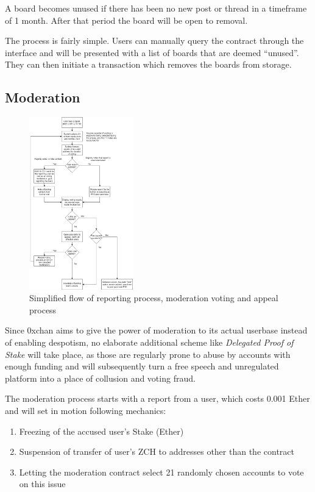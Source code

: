\documentclass[a4paper]{article}
\newcommand{\projectname}{0xchan}
\begin{document}
A board becomes unused if there has been no new post or thread in a timeframe of 1 month. After that period the board will be open to removal.

The process is fairly simple. Users can manually query the contract through the interface and will be presented with a list of boards that are deemed ``unused''. They can then initiate a transaction which removes the boards from storage.

\subsection{Moderation}
\begin{figure}
    \includegraphics[width=0.4\textwidth]{0x_moderation.png}
    \caption{Simplified flow of reporting process, moderation voting and appeal process}
    \label{fig:mod}
\end{figure}

Since \projectname{} aims to give the power of moderation to its actual userbase instead of enabling despotism, no elaborate additional scheme like \emph{Delegated Proof of Stake} will take place, as those are regularly prone to abuse by accounts with enough funding and will subsequently turn a free speech and unregulated platform into a place of collusion and voting fraud.

The moderation process starts with a report from a user, which costs 0.001 Ether and will set in motion following mechanics:

\begin{enumerate}
    \item Freezing of the accused user's Stake (Ether)
    \item Suspension of transfer of user's ZCH to addresses other than the contract
    \item Letting the moderation contract select 21 randomly chosen accounts to vote on this issue
\end{enumerate}
\end{document}

